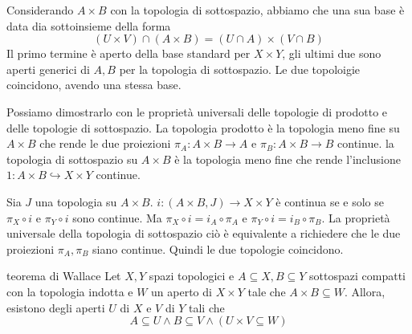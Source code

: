 \documentclass[a4paper]{article}
\begin{document}
\begin{snippetproof}{}
    Considerando \(A \times B\) con la topologia di sottospazio,
    abbiamo che una sua base è data dia sottoinsieme della forma
    \[
        (U \times V) \cap (A \times B) = (U \cap A) \times (V \cap B)
    \]
    Il primo termine è aperto della base standard
    per \(X \times Y\), gli ultimi due sono aperti generici di \(A,B\)
    per la topologia di sottospazio.
    Le due topoloigie coincidono, avendo una stessa base.

    Possiamo dimostrarlo con le proprietà universali delle topologie di prodotto e
    delle topologie di sottospazio.
    La topologia prodotto è la topologia meno fine su \(A \times B\)
    che rende le due proiezioni
    \(\pi_A \colon A \times B \to A\) e \(\pi_B \colon A \times B \to B\)
    continue. la topologia di sottospazio su \(A \times B\) è la topologia meno fine che rende l'inclusione
    \(1\colon A \times B \hookrightarrow X \times Y\) continue.
    \begin{center}
    \end{center}
    Sia \(J\) una topologia su \(A \times B\).
    \(i\colon (A \times B, J) \to X \times Y\) è continua
    se e solo se \(\pi_X \circ i\) e \(\pi_Y \circ i\) sono continue.
    Ma \(\pi_X \circ i = i_A \circ \pi_A\) e \(\pi_Y \circ i = i_B \circ \pi_B\).
    La proprietà universale della topologia di sottospazio ciò è equivalente a richiedere che
    le due proiezioni \(\pi_A, \pi_B\) siano continue.
    Quindi le due topologie coincidono.
\end{snippetproof}



\begin{snippettheorem}{teorema di Wallace}
    Let \(X,Y\) spazi topologici e \(A \subseteq X, B \subseteq Y\)
    sottospazi compatti con la topologia indotta e \(W\)
    un aperto di \(X \times Y\) tale che \(A \times B \subseteq W\).
    Allora, esistono degli aperti \(U\) di \(X\)
    e \(V\) di \(Y\) tali che
    \[
        A \subseteq U \land B \subseteq V \land (U \times V \subseteq W)
    \]
\end{snippettheorem}
\end{document}
